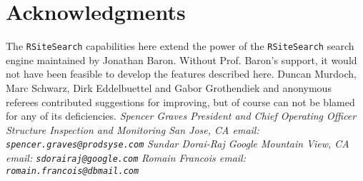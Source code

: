 \section*{Acknowledgments}
The {\tt RSiteSearch} capabilities here extend the power of the
{\tt RSiteSearch} search engine maintained by Jonathan Baron.
Without Prof. Baron's support, it would not have been feasible
to develop the features described here.  Duncan Murdoch, Marc Schwarz, 
Dirk Eddelbuettel and Gabor Grothendiek and anonymous 
referees contributed suggestions for improving, but of course
can not be blamed for any of its deficiencies.  
\newline \newline
\emph{Spencer Graves \newline
President and Chief Operating Officer \newline
Structure Inspection and Monitoring \newline
San Jose, CA \newline
email:  {\tt spencer.graves@prodsyse.com} }
\newline \newline
\emph{Sundar Dorai-Raj \newline
Google \newline
Mountain View, CA \newline
email:  {\tt sdorairaj@google.com} }
\newline \newline
\emph{Romain Francois \newline
\newline
\newline
email:  {\tt romain.francois@dbmail.com} }

